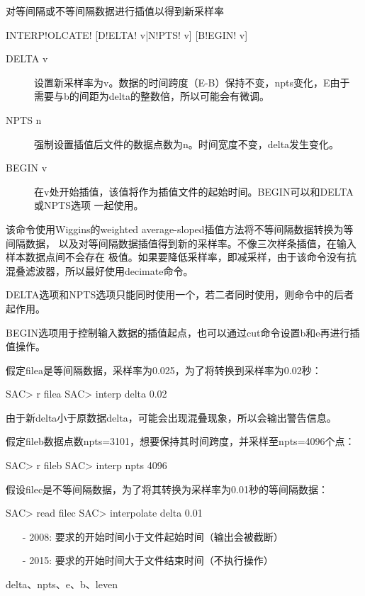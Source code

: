 \label{cmd:interpolate}

对等间隔或不等间隔数据进行插值以得到新采样率

\begin{SACSTX}
INTERP!OLCATE! [D!ELTA! v|N!PTS! v] [B!EGIN! v]
\end{SACSTX}

\begin{description}
\item [DELTA v] 设置新采样率为v。数据的时间跨度（E-B）保持不变，npts变化，E由于
    需要与b的间距为delta的整数倍，所以可能会有微调。
\item [NPTS n] 强制设置插值后文件的数据点数为n。时间宽度不变，delta发生变化。
\item [BEGIN v] 在v处开始插值，该值将作为插值文件的起始时间。BEGIN可以和DELTA或NPTS选项
    一起使用。
\end{description}

该命令使用Wiggins的weighted average-sloped插值方法将不等间隔数据转换为等间隔数据，
以及对等间隔数据插值得到新的采样率。不像三次样条插值，在输入样本数据点间不会存在
极值。如果要降低采样率，即减采样，由于该命令没有抗混叠滤波器，所以最好使用decimate命令。

DELTA选项和NPTS选项只能同时使用一个，若二者同时使用，则命令中的后者起作用。

BEGIN选项用于控制输入数据的插值起点，也可以通过cut命令设置b和e再进行插值操作。

假定filea是等间隔数据，采样率为0.025，为了将转换到采样率为0.02秒：
\begin{SACCode}
SAC> r filea
SAC> interp delta 0.02
\end{SACCode}
由于新delta小于原数据delta，可能会出现混叠现象，所以会输出警告信息。

假定fileb数据点数npts=3101，想要保持其时间跨度，并采样至npts=4096个点：
\begin{SACCode}
SAC> r fileb
SAC> interp npts 4096
\end{SACCode}

假设filec是不等间隔数据，为了将其转换为采样率为0.01秒的等间隔数据：
\begin{SACCode}
SAC> read filec
SAC> interpolate delta 0.01
\end{SACCode}

\begin{itemize}
\item[-]2008: 要求的开始时间小于文件起始时间（输出会被截断）
\item[-]2015: 要求的开始时间大于文件结束时间（不执行操作）
\end{itemize}

delta、npts、e、b、leven
